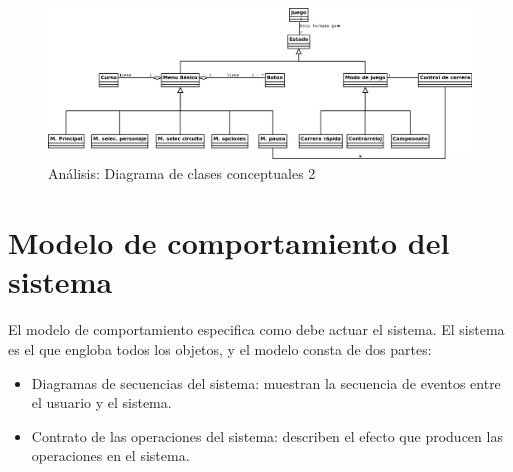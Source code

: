 \begin{figure}[H]
  \label{diagrama_clases_conceptuales}
  \begin{center}
    \includegraphics[scale=0.35]{imagenes/analisis/diagrama_clases_conceptuales1.png}
  \end{center}
  \caption{Análisis: Diagrama de clases conceptuales 2}
\end{figure}

\section{Modelo de comportamiento del sistema}

\paragraph{}
El modelo de comportamiento especifica como debe actuar el sistema. El sistema es el que engloba todos los objetos, y el modelo
consta de dos partes:

\begin{itemize}
    \item Diagramas de secuencias del sistema: muestran la secuencia de eventos entre el usuario y el sistema.
    \item Contrato de las operaciones del sistema: describen el efecto que producen las operaciones en el sistema.
\end{itemize}

